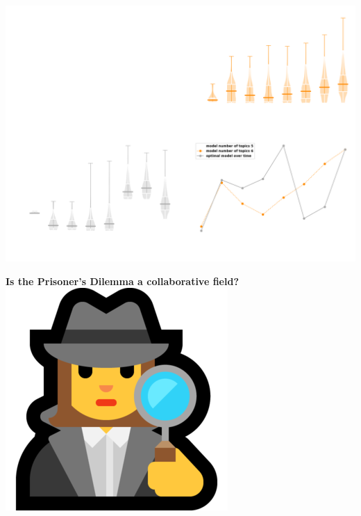 \documentclass{beamer}
\begin{document}
\begin{frame}
    \begin{center}
        
    \end{center}
\end{frame}

\begin{frame}
    \begin{center}
    \includegraphics[width=\textwidth]{static/contribution_over_time.png}
    \end{center}
\end{frame}


\begin{frame}
    \begin{center}
        \LARGE{\textbf{Is the Prisoner's Dilemma a collaborative field?}} \\ \vspace{.6cm}
        \includegraphics[width=.15\textwidth]{static/detective.png} \\ \vspace{.5cm}
    \end{center}
\end{frame}
\end{document}
